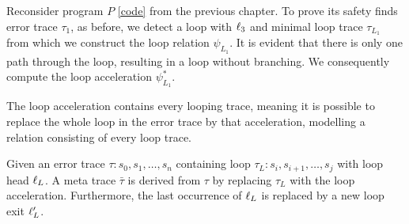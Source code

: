 
\begin{comment}
	\jw{Accelerated Interpolation as an extension of trace abstraction is introduced $\rightarrow$ Show how to utilize loop summaries within trace abstraction \\
	- Error traces  $\rightarrow$ loop relations  $\rightarrow$ reflexive transitive closures  $\rightarrow$ meta traces  $\rightarrow$ interpolation on meta traces \\
	- "We implemented accelerated interpolation in an earlier project using a myriad of loop summarization techniques... " $\rightarrow$ Introduce various loop summarization techniques (FastUPR, Jordan, Werner) NOT in-depth, only their ideas, but show their pros and cons  $\rightarrow$ The cons build a bridge to the next chapter \\
	- running example will be transformed to a meta trace WITHOUT actual loop summarizations on edges \\
	\vspace{1cm}
	22 pages $\rightarrow$ recycled from earlier}
\end{comment}

Reconsider program $P$ \ref{code} from the previous chapter.
To prove its safety \traceabstraction finds error trace $\tau_1$, as before, we detect a loop with $\ell_{3}$ and minimal loop trace $\tau_{L_1}$ from which we construct the loop relation $\psi_{L_1}$.
It is evident that there is only one path through the loop, resulting in a loop without branching.
We consequently compute the loop acceleration $\psi^*_{L_1}$.

The loop acceleration contains every looping trace, meaning it is possible to replace the whole loop in the error trace by that acceleration, modelling a relation consisting of every loop trace.

\begin{mydef}
	Given an error trace $\tau: s_0, s_1, \ldots, s_n$ containing loop $\tau_L: s_i, s_{i+1}, \ldots, s_j$ with loop head $\ell_{L}$.
	A meta trace $\bar{\tau}$ is derived from $\tau$ by replacing $\tau_L$ with the loop acceleration.
	Furthermore, the last occurrence of $\ell_{L}$ is replaced by a new loop exit $\ell_{L}'$.
\end{mydef}

